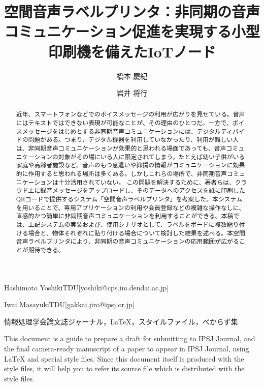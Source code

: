 \documentclass[submit, uplatex]{ipsj}
\begin{document}
\title{空間音声ラベルプリンタ：非同期の音声コミュニケーション促進を実現する小型印刷機を備えたIoTノード}





\author{橋本 慶紀}{Hashimoto Yoshiki}{TDU}[yoshiki@cps.im.dendai.ac.jp]
\author{岩井 将行}{Iwai Masayuki}{TDU}[gakkai.jiro@ipsj.or.jp]


\begin{abstract}
近年、スマートフォンなどでのボイスメッセージの利用が広がりを見せている。音声にはテキストではできない表現が可能なことが、その理由のひとつだ。一方で、ボイスメッセージをはじめとする非同期音声コミュニケーションには、デジタルディバイドの問題がある。つまり、デジタル機器を利用していなかったり、利用が難しい人は、非同期音声コミュニケーションが効果的と思われる場面であっても、音声コミュニケーションの対象がその場にいる人に限定されてしまう。たとえば幼い子供がいる家庭や高齢者施設など、音声のもつ息遣いや抑揚の情報がコミュニケーションに効果的に作用すると思われる場所は多くある。しかしこれらの場所で、非同期音声コミュニケーションは十分活用されていない。
この問題を解決するために、著者らは、クラウド上に録音メッセージをアップロードし、そのデータへのアクセスを紙に印刷したQRコードで提供するシステム「空間音声ラベルプリンタ」を考案した。本システムを用いることで、専用アプリケーションの利用や会員登録などの複雑な操作なしに、直感的かつ簡単に非同期音声コミュニケーションを利用することができる。本稿では、上記システムの実装および、使用シナリオとして、ラベルをボードに複数貼り付ける場合と、物体それぞれに貼り付ける場合について検討した結果を述べる。本空間音声ラベルプリンタにより、非同期の音声コミュニケーションの応用範囲が広がることが期待できる。
\end{abstract}


\begin{jkeyword}
情報処理学会論文誌ジャーナル，\LaTeX，スタイルファイル，べからず集
\end{jkeyword}

\begin{eabstract}
This document is a guide to prepare a draft for submitting to IPSJ
Journal, and the final camera-ready manuscript of a paper to appear in
IPSJ Journal, using {\LaTeX} and special style files.  Since this
document itself is produced with the style files, it will help you to
refer its source file which is distributed with the style files.
\end{eabstract}
\end{document}
